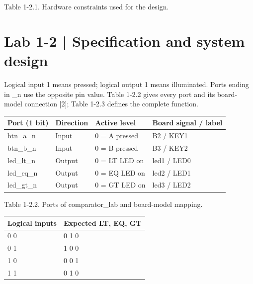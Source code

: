 \documentclass[10pt,a4paper]{article}
\begin{document}
{\small\raggedright Table 1-2.1. Hardware constraints used for the design.\par}

\clearpage

\section*{Lab 1-2 | Specification and system design}

Logical input 1 means pressed; logical output 1 means illuminated. Ports ending in \_n use the opposite pin value. Table 1-2.2 gives every port and its board-model connection [2]; Table 1-2.3 defines the complete function.\par

\begingroup\small\setlength{\tabcolsep}{4pt}
\renewcommand{\arraystretch}{1.20}
\noindent\begin{tabular}{@{}p{}p{}p{}p{}@{}}
\toprule
\textbf{Port (1 bit)} & \textbf{Direction} & \textbf{Active level} & \textbf{Board signal / label} \\
\midrule
btn\_a\_n & Input & 0 = A pressed & B2 / KEY1 \\
btn\_b\_n & Input & 0 = B pressed & B3 / KEY2 \\
led\_lt\_n & Output & 0 = LT LED on & led1 / LED0 \\
led\_eq\_n & Output & 0 = EQ LED on & led2 / LED1 \\
led\_gt\_n & Output & 0 = GT LED on & led3 / LED2 \\
\bottomrule
\end{tabular}\par\endgroup
\vspace{2mm}

{\small\raggedright Table 1-2.2. Ports of comparator\_lab and board-model mapping.\par}

\begingroup\small\setlength{\tabcolsep}{4pt}
\renewcommand{\arraystretch}{1.20}
\noindent\begin{tabular}{@{}p{}p{}@{}}
\toprule
\textbf{Logical inputs} & \textbf{Expected LT, EQ, GT} \\
\midrule
0 0 & 0 1 0 \\
0 1 & 1 0 0 \\
1 0 & 0 0 1 \\
1 1 & 0 1 0 \\
\bottomrule
\end{tabular}\par\endgroup
\vspace{2mm}
\end{document}
